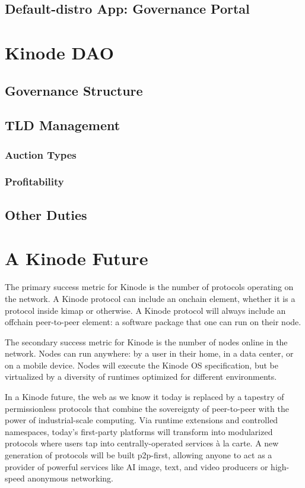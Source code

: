 \documentclass[runningheads]{llncs}
\begin{document}
\subsection{Default-distro App: Governance Portal}


%
%
%
\section{Kinode DAO}


\subsection{Governance Structure}
\subsection{TLD Management}
\subsubsection{Auction Types}
\subsubsection{Profitability}
\subsection{Other Duties}
%
%
%
\section{A Kinode Future}

The primary success metric for Kinode is the number of protocols operating on the network.
A Kinode protocol can include an onchain element, whether it is a protocol inside kimap or otherwise.
A Kinode protocol will always include an offchain peer-to-peer element: a software package that one can run on their node.

The secondary success metric for Kinode is the number of nodes online in the network.
Nodes can run anywhere: by a user in their home, in a data center, or on a mobile device.
Nodes will execute the Kinode OS specification, but be virtualized by a diversity of runtimes optimized for different environments.

In a Kinode future, the web as we know it today is replaced by a tapestry of permissionless protocols that combine the sovereignty of peer-to-peer with the power of industrial-scale computing.
Via runtime extensions and controlled namespaces, today's first-party platforms will transform into modularized protocols where users tap into centrally-operated services à la carte.
A new generation of protocols will be built p2p-first, allowing anyone to act as a provider of powerful services like AI image, text, and video producers or high-speed anonymous networking.
\end{document}

